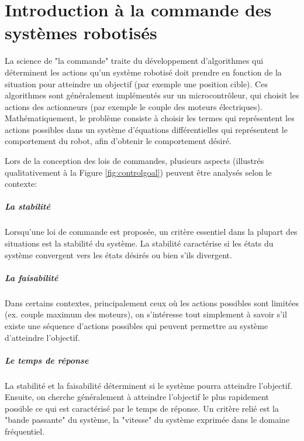 \chapter{Introduction à la commande des systèmes robotisés}
\label{sec:introcommanderobots}

La science de "la commande" traite du développement d'algorithmes qui déterminent les actions qu'un système robotisé doit prendre en fonction de la situation pour atteindre un objectif (par exemple une position cible). Ces algorithmes sont généralement implémentés sur un microcontrôleur, qui choisit les actions des actionneurs (par exemple le couple des moteurs électriques). Mathématiquement, le problème consiste à choisir les termes qui représentent les actions possibles dans un système d'équations différentielles qui représentent le comportement du robot, afin d'obtenir le comportement désiré.

Lors de la conception des lois de commandes, plusieurs aspects (illustrés qualitativement à la Figure \ref{fig:controlgoal}) peuvent être analysés selon le contexte:

\paragraph{La stabilité}

Lorsqu'une loi de commande est proposée, un critère essentiel dans la plupart des situations est la stabilité du système. La stabilité caractérise si les états du système convergent vers les états désirés ou bien s’ils divergent.

\paragraph{La faisabilité}

Dans certains contextes, principalement ceux où les actions possibles sont limitées (ex. couple maximum des moteurs), on s'intéresse tout simplement à savoir s’il existe une séquence d'actions possibles qui peuvent permettre au système d'atteindre l'objectif.

\paragraph{Le temps de réponse}

La stabilité et la faisabilité déterminent si le système pourra atteindre l'objectif. Ensuite, on cherche généralement à atteindre l'objectif le plus rapidement possible ce qui est caractérisé par le temps de réponse. Un critère relié est la "bande passante" du système, la "vitesse" du système exprimée dans le domaine fréquentiel.

